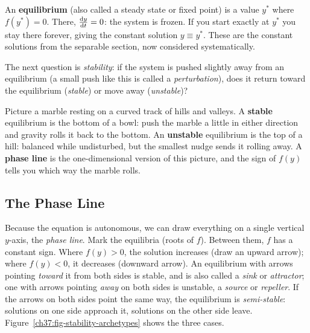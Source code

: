 An \textbf{equilibrium} (also called a steady state or fixed point) is a value $y^*$ where
$f(y^*)=0$. There, $\frac{\mathrm{d} y}{\mathrm{d} t}=0$: the system is frozen. If you start exactly at
$y^*$ you stay there forever, giving the constant solution $y\equiv y^*$. These are
the constant solutions from the separable section, now considered systematically.

The next question is \emph{stability}: if the system is pushed slightly away
from an equilibrium (a small push like this is called a \emph{perturbation}), does
it return toward the equilibrium (\emph{stable}) or move away (\emph{unstable})?

\begin{intuitionbox}
Picture a marble resting on a curved track of hills and valleys. A \textbf{stable}
equilibrium is the bottom of a bowl: push the marble a little in either direction
and gravity rolls it back to the bottom. An \textbf{unstable} equilibrium
is the top of a hill: balanced while undisturbed, but the
smallest nudge sends it rolling away. A \textbf{phase line}
is the one-dimensional version of this picture, and the sign of $f(y)$ tells you
which way the marble rolls.
\end{intuitionbox}

\subsection{The Phase Line}

Because the equation is autonomous, we can draw everything on a single vertical
$y$-axis, the \emph{phase line}. Mark the equilibria (roots of $f$). Between them,
$f$ has a constant sign. Where $f(y)>0$, the solution increases (draw an upward
arrow); where $f(y)<0$, it decreases (downward arrow). An equilibrium with arrows
pointing \emph{toward} it from both sides is stable, and is also called a
\emph{sink} or \emph{attractor}; one with arrows pointing \emph{away} on both sides
is unstable, a \emph{source} or \emph{repeller}. If the arrows on both sides point
the same way, the equilibrium is \emph{semi-stable}: solutions on one side approach
it, solutions on the other side leave. Figure~\ref{ch37:fig-stability-archetypes}
shows the three cases.

